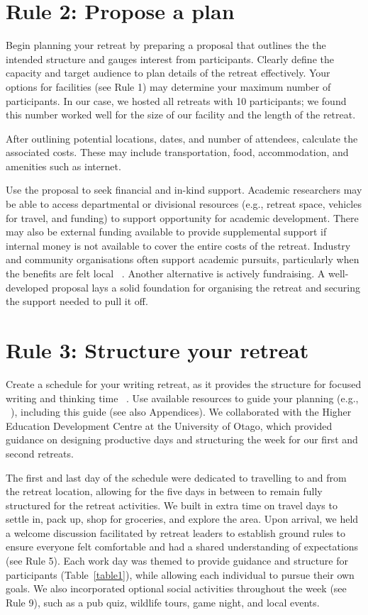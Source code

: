 \documentclass[10pt,letterpaper]{article}
\begin{document}
\section*{Rule 2: Propose a plan}

Begin planning your retreat by preparing a proposal that outlines the the intended structure and gauges interest from participants. Clearly define the capacity and target audience to plan details of the retreat effectively. Your options for facilities (see Rule 1) may determine your maximum number of participants. In our case, we hosted all retreats with 10 participants; we found this number worked well for the size of our facility and the length of the retreat.

After outlining potential locations, dates, and number of attendees, calculate the associated costs. These may include transportation, food, accommodation, and amenities such as internet.

Use the proposal to seek financial and in-kind support. Academic researchers may be able to access departmental or divisional resources (e.g., retreat space, vehicles for travel, and funding) to support opportunity for academic development. There may also be external funding available to provide supplemental support if internal money is not available to cover the entire costs of the retreat. Industry and community organisations often support academic pursuits, particularly when the benefits are felt local ~\cite{CSI-funding}. Another alternative is actively fundraising. A well-developed proposal lays a solid foundation for organising the retreat and securing the support needed to pull it off.

\section*{Rule 3: Structure your retreat}

Create a schedule for your writing retreat, as it provides the structure for focused writing and thinking time ~\cite{murray2009, tremblay2021}. Use available resources to guide your planning (e.g., ~\cite{tremblay2021, ponomarenko2017ten}), including this guide (see also Appendices). We collaborated with the Higher Education Development Centre at the University of Otago, which provided guidance on designing productive days and structuring the week for our first and second retreats.

The first and last day of the schedule were dedicated to travelling to and from the retreat location, allowing for the five days in between to remain fully structured for the retreat activities. We built in extra time on travel days to settle in, pack up, shop for groceries, and explore the area. Upon arrival, we held a welcome discussion facilitated by retreat leaders to establish ground rules to ensure everyone felt comfortable and had a shared understanding of expectations (see Rule 5). Each work day was themed to provide guidance and structure for participants (Table~\ref{table1}), while allowing each individual to pursue their own goals. We also incorporated optional social activities throughout the week (see Rule 9), such as a pub quiz, wildlife tours, game night, and local events.
\end{document}
